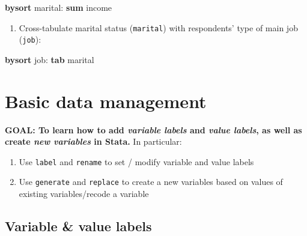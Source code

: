 \documentclass[
]{book}
\newenvironment{Shaded}{\begin{snugshade}}{\end{snugshade}}
\newcommand{\KeywordTok}[1]{\textcolor[rgb]{0.13,0.29,0.53}{\textbf{#1}}}
\newcommand{\NormalTok}[1]{#1}
\providecommand{\tightlist}{%
  \setlength{\itemsep}{0pt}\setlength{\parskip}{0pt}}
\begin{document}
\begin{alert}
\begin{Shaded}
\begin{Highlighting}[]
\KeywordTok{bysort}\NormalTok{ marital: }\KeywordTok{sum}\NormalTok{ income}
\end{Highlighting}
\end{Shaded}

\begin{enumerate}
\def\labelenumi{\arabic{enumi}.}
\setcounter{enumi}{4}
\tightlist
\item
  Cross-tabulate marital status (\texttt{marital}) with respondents' type of main job (\texttt{job}):
\end{enumerate}

\begin{Shaded}
\begin{Highlighting}[]
\KeywordTok{bysort}\NormalTok{ job: }\KeywordTok{tab}\NormalTok{ marital  }
\end{Highlighting}
\end{Shaded}

\end{alert}

\hypertarget{basic-data-management}{%
\section{Basic data management}\label{basic-data-management}}

\begin{alert}

\textbf{GOAL: To learn how to add \emph{variable labels} and \emph{value labels}, as well as create \emph{new variables} in Stata.} In particular:

\begin{enumerate}
\def\labelenumi{\arabic{enumi}.}
\tightlist
\item
  Use \texttt{label} and \texttt{rename} to set / modify variable and value labels
\item
  Use \texttt{generate} and \texttt{replace} to create a new variables based on values of existing variables/recode a variable
\end{enumerate}

\end{alert}

\hypertarget{variable-value-labels}{%
\subsection{Variable \& value labels}\label{variable-value-labels}}
\end{document}
